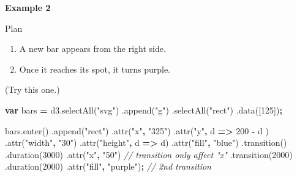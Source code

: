 \documentclass[openany]{book}
\newenvironment{Shaded}{\begin{snugshade}}{\end{snugshade}}
\newcommand{\AttributeTok}[1]{\textcolor[rgb]{0.77,0.63,0.00}{#1}}
\newcommand{\CommentTok}[1]{\textcolor[rgb]{0.56,0.35,0.01}{\textit{#1}}}
\newcommand{\DecValTok}[1]{\textcolor[rgb]{0.00,0.00,0.81}{#1}}
\newcommand{\KeywordTok}[1]{\textcolor[rgb]{0.13,0.29,0.53}{\textbf{#1}}}
\newcommand{\NormalTok}[1]{#1}
\newcommand{\OperatorTok}[1]{\textcolor[rgb]{0.81,0.36,0.00}{\textbf{#1}}}
\newcommand{\StringTok}[1]{\textcolor[rgb]{0.31,0.60,0.02}{#1}}
\newcommand{\VariableTok}[1]{\textcolor[rgb]{0.00,0.00,0.00}{#1}}
\begin{document}
\textbf{Example 2}

Plan

\begin{enumerate}
\def\labelenumi{\arabic{enumi}.}
\item
  A new bar appears from the right side.
\item
  Once it reaches its spot, it turns purple.
\end{enumerate}

(Try this one.)

\begin{Shaded}
\begin{Highlighting}[]
\KeywordTok{var}\NormalTok{ bars }\OperatorTok{=} \VariableTok{d3}\NormalTok{.}\AttributeTok{selectAll}\NormalTok{(}\StringTok{"svg"}\NormalTok{)}
\NormalTok{  .}\AttributeTok{append}\NormalTok{(}\StringTok{"g"}\NormalTok{)}
\NormalTok{  .}\AttributeTok{selectAll}\NormalTok{(}\StringTok{"rect"}\NormalTok{)}
\NormalTok{  .}\AttributeTok{data}\NormalTok{([}\DecValTok{125}\NormalTok{])}\OperatorTok{;}
  
\VariableTok{bars}\NormalTok{.}\AttributeTok{enter}\NormalTok{()                 }
\NormalTok{  .}\AttributeTok{append}\NormalTok{(}\StringTok{"rect"}\NormalTok{)}
\NormalTok{    .}\AttributeTok{attr}\NormalTok{(}\StringTok{"x"}\OperatorTok{,} \StringTok{"325"}\NormalTok{)}
\NormalTok{    .}\AttributeTok{attr}\NormalTok{(}\StringTok{"y"}\OperatorTok{,}\NormalTok{ d }\OperatorTok{=>} \DecValTok{200} \OperatorTok{-}\NormalTok{ d )}
\NormalTok{    .}\AttributeTok{attr}\NormalTok{(}\StringTok{"width"}\OperatorTok{,} \StringTok{"30"}\NormalTok{)}
\NormalTok{    .}\AttributeTok{attr}\NormalTok{(}\StringTok{"height"}\OperatorTok{,}\NormalTok{ d }\OperatorTok{=>}\NormalTok{ d)}
\NormalTok{    .}\AttributeTok{attr}\NormalTok{(}\StringTok{"fill"}\OperatorTok{,} \StringTok{"blue"}\NormalTok{)}
\NormalTok{  .}\AttributeTok{transition}\NormalTok{()}
\NormalTok{  .}\AttributeTok{duration}\NormalTok{(}\DecValTok{3000}\NormalTok{)}
\NormalTok{    .}\AttributeTok{attr}\NormalTok{(}\StringTok{"x"}\OperatorTok{,} \StringTok{"50"}\NormalTok{)   }\CommentTok{// transition only affect "x"}
\NormalTok{  .}\AttributeTok{transition}\NormalTok{(}\DecValTok{2000}\NormalTok{)}
\NormalTok{  .}\AttributeTok{duration}\NormalTok{(}\DecValTok{2000}\NormalTok{)}
\NormalTok{    .}\AttributeTok{attr}\NormalTok{(}\StringTok{"fill"}\OperatorTok{,} \StringTok{"purple"}\NormalTok{)}\OperatorTok{;}  \CommentTok{// 2nd transition}
\end{Highlighting}
\end{Shaded}
\end{document}
